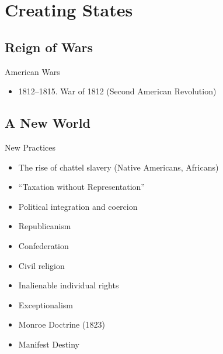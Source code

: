 



\section{Creating States}


\subsection{Reign of Wars}
\begin{frame}{American Wars}
	\begin{itemize}
		\item<10->1812--1815. War of 1812 (Second American Revolution)
	\end{itemize}
\end{frame}

\subsection{A New World}
\begin{frame}{New Practices}
	\begin{itemize}
		\item<1->The rise of chattel slavery (Native Americans, Africans)
		\item<2->``Taxation without Representation''
		\item<3->Political integration and coercion
		\item<4->Republicanism
		\item<5->Confederation
		\item<6->Civil religion
		\item<7->Inalienable individual rights
		\item<8->Exceptionalism
		\item<9->Monroe Doctrine (1823)
		\item<10->Manifest Destiny
	\end{itemize}
\end{frame}

